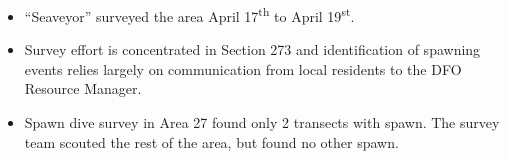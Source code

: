 \begin{itemize}
\item ``Seaveyor'' surveyed the area April 17\textsuperscript{th} to April 19\textsuperscript{st}.
\item Survey effort is concentrated in Section 273 and identification of spawning events relies largely on communication from local residents to the DFO Resource Manager.
\item Spawn dive survey in Area 27 found only 2 transects with spawn.
The survey team scouted the rest of the area, but found no other spawn.
\end{itemize}
